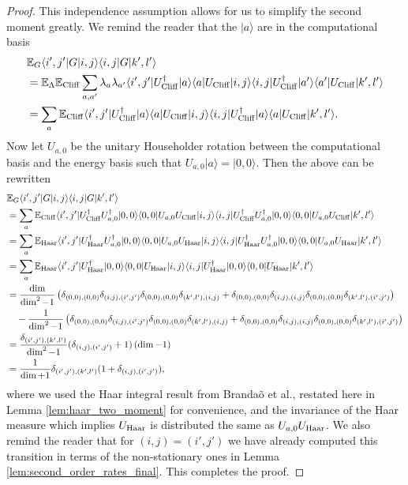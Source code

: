 \documentclass[
 amsmath,amssymb,
 aps,
onecolumn, 
nofootinbib]{revtex4-2}
\newcommand{\ket}[1]{|#1\rangle}
\newcommand{\bra}[1]{\langle #1|}
\newcommand{\parens}[1]{\left( #1 \right)}
\newcommand{\EE}{\mathbb{E}}
\begin{document}
\begin{proof}
This independence assumption allows for us to simplify the second moment greatly. We remind the reader that the $\ket{a}$ are in the computational basis 
\begin{align}
    &\EE_G \bra{i', j'} G \ket{i,j}\bra{i,j} G \ket{k', l'} \\
    &= \EE_{\Lambda} \EE_{\rm Cliff} \sum_{a, a'} \lambda_{a} \lambda_{a'} \bra{i',j'} U_{\rm Cliff}^\dagger \ket{a} \bra{a} U_{\rm Cliff} \ket{i,j} \bra{i,j} U_{\rm Cliff}^\dagger \ket{a'} \bra{a'} U_{\rm Cliff} \ket{k',l'} \\
    &= \sum_a \EE_{\rm Cliff}  \bra{i',j'} U_{\rm Cliff}^\dagger \ket{a} \bra{a} U_{\rm Cliff} \ket{i,j} \bra{i,j} U_{\rm Cliff}^\dagger \ket{a} \bra{a} U_{\rm Cliff} \ket{k',l'}.
\end{align}
Now let $U_{a, 0}$ be the unitary Householder rotation between the computational basis and the energy basis such that $U_{a,0} \ket{a} = \ket{0, 0}$. Then the above can be rewritten
\begin{align}
    &\EE_G \bra{i', j'} G \ket{i,j}\bra{i,j} G \ket{k', l'} \\
    &= \sum_a \EE_{\rm Cliff}  \bra{i',j'} U_{\rm Cliff}^\dagger U_{a,0}^\dagger \ket{0,0} \bra{0,0} U_{a,0} U_{\rm Cliff} \ket{i,j} \bra{i,j} U_{\rm Cliff}^\dagger U_{a, 0}^\dagger \ket{0,0} \bra{0,0} U_{a,0} U_{\rm Cliff} \ket{k',l'} \\
        &= \sum_{a} \EE_{\rm Haar} \bra{i',j'} U_{\rm Haar}^\dagger U_{a,0}^\dagger \ket{0, 0} \bra{0,0} U_{a,0} U_{\rm Haar} \ket{i,j} \bra{i,j} U_{\rm Haar}^\dagger U_{a,0}^\dagger \ket{0,0} \bra{0,0} U_{a,0} U_{\rm Haar} \ket{k', l'} \\
    &= \sum_{a} \EE_{\rm Haar} \bra{i',j'} U_{\rm Haar}^\dagger \ket{0, 0} \bra{0,0} U_{\rm Haar} \ket{i,j} \bra{i,j} U_{\rm Haar}^\dagger \ket{0,0} \bra{0,0} U_{\rm Haar} \ket{k', l'} \\
    &= \frac{\dim}{\dim^2 - 1} \parens{\delta_{(0,0), (0,0)} \delta_{(i, j), (i',j')} \delta_{(0,0), (0,0)} \delta_{(k',l'), (i,j)} + \delta_{(0,0), (0,0)} \delta_{(i,j), (i,j)} \delta_{(0,0), (0,0)} \delta_{(k', l'), (i', j')}} \nonumber \\
    &\quad - \frac{1}{\dim^2 - 1} \parens{\delta_{(0, 0), (0, 0)} \delta_{(i, j), (i', j')} \delta_{(0,0), (0,0)} \delta_{(k', l'), (i,j)} + \delta_{(0,0), (0,0)} \delta_{(i,j),(i,j)} \delta_{(0,0), (0,0)} \delta_{(k', l'), (i',j')}} \\
    &= \frac{\delta_{(i',j'), (k', l')}}{\dim^2 - 1} (\delta_{(i,j), (i',j')} + 1) \left( \dim - 1  \right) \\
    &= \frac{1}{\dim + 1} \delta_{(i', j'), (k', l')} (1 + \delta_{(i,j), (i', j')}),
\end{align}
where we used the Haar integral result from Brandaõ et al., restated here in Lemma \ref{lem:haar_two_moment} for convenience, and the invariance of the Haar measure which implies $U_{\rm Haar}$ is distributed the same as $U_{a,0} U_{\rm Haar}$. We also remind the reader that for $(i,j) = (i',j')$ we have already computed this transition in terms of the non-stationary ones in Lemma \ref{lem:second_order_rates_final}. This completes the proof.
\end{proof}
\end{document}
